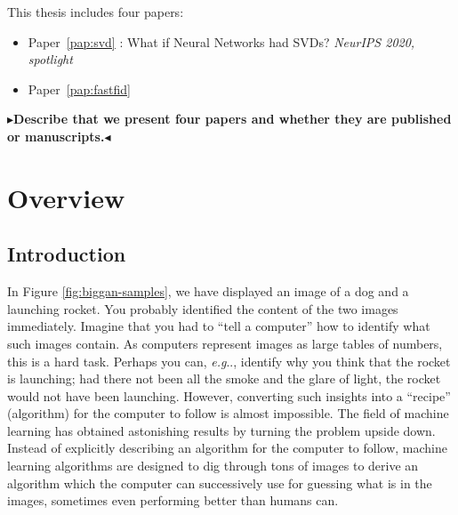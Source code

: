 \documentclass[11pt,a4paper,twoside,openright,final]{memoir}
\makeatletter
\def\ifdraft{\ifdim\overfullrule>\z@
  \expandafter\@firstoftwo\else\expandafter\@secondoftwo\fi}
\newcommand{\todo}[1]{{
    \ifdraft{
        \color[rgb]{.5,0,0}\textbf{
            $\blacktriangleright$#1$\blacktriangleleft$
         }
    }{}}}
\DeclareRobustCommand\onedot{\futurelet\@let@token\@onedot}
\def\@onedot{\ifx\@let@token.\else.\null\fi\xspace}
\def\eg{\emph{e.g}\onedot} \def\Eg{\emph{E.g}\onedot}
\newcommand*{\paperref}[1]{Paper~\hyperref[#1]{\ref{#1}}}
\makeatother
\begin{document}
\cite{ecinn, fastfid, fasth, evaluation}

This thesis includes four papers:
\begin{itemize}
    \item \paperref{pap:svd} \cite{fasth}: What if Neural Networks had SVDs? \emph{NeurIPS 2020, spotlight}
    \item \paperref{pap:fastfid} \cite{fid}
\end{itemize}

\todo{Describe that we present four papers and whether they are published or manuscripts.}

\cleardoublepage

\tableofcontents
\cleardoublepage

\mainmatter 


\part{Overview}
\label{part:overview}


\chapter{Introduction} 
In Figure \ref{fig:biggan-samples}, we have displayed an image of a dog and a launching rocket. 
You probably identified the content of the two images immediately. 
Imagine that you had to ``tell a computer'' how to identify what such images contain.
As computers represent images as large tables of numbers, this is a hard task.  
Perhaps you can, \eg, identify why you think that the rocket is launching; had there not been all the smoke and the glare of light, the rocket would not have been launching.
However, converting such insights into a ``recipe'' (algorithm) for the computer to follow is almost impossible.
The field of machine learning has obtained astonishing results by turning the problem upside down.
Instead of explicitly describing an algorithm for the computer to follow, machine learning algorithms are designed to dig through tons of images to derive an algorithm which the computer can successively use for guessing what is in the images, sometimes even performing better than humans can. 
\end{document}
